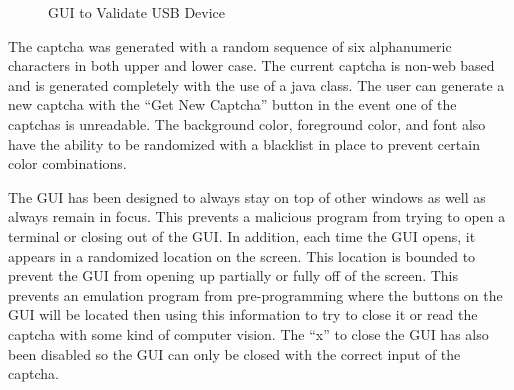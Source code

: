 \documentclass[pagenumbers]{ieee}
\begin{document}
\begin{figure}[H]
	\caption{GUI to Validate USB Device}
	\label{fig:JavaGUI}
\end{figure}

The captcha was generated with a random sequence of six alphanumeric characters in both upper and lower case. The current captcha is non-web based and is generated completely with the use of a java class. The user can generate a new captcha with the ``Get New Captcha'' button in the event one of the captchas is unreadable. The background color, foreground color, and font also have the ability to be randomized with a blacklist in place to prevent certain color combinations.

The GUI has been designed to always stay on top of other windows as well as always remain in focus. This prevents a malicious program from trying to open a terminal or closing out of the GUI. In addition, each time the GUI opens, it appears in a randomized location on the screen. This location is bounded to prevent the GUI from opening up partially or fully off of the screen. This prevents an emulation program from pre-programming where the buttons on the GUI will be located then using this information to try to close it or read the captcha with some kind of computer vision. The ``x'' to close the GUI has also been disabled so the GUI can only be closed with the correct input of the captcha.
\end{document}
